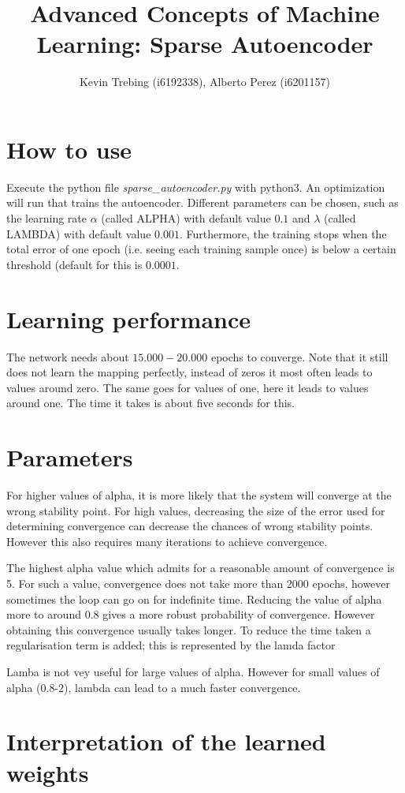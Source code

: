 \documentclass[a4paper]{article}
\title{Advanced Concepts of Machine Learning: Sparse Autoencoder}
\author{Kevin Trebing (i6192338), Alberto Perez (i6201157)}
\begin{document}
\maketitle

\section{How to use}
Execute the python file \textit{sparse\_autoencoder.py} with python3. An optimization will run that trains the autoencoder. Different parameters can be chosen, such as the learning rate $\alpha$ (called ALPHA) with default value $0.1$ and $\lambda$ (called LAMBDA) with default value $0.001$. Furthermore, the training stops when the total error of one epoch (i.e. seeing each training sample once) is below a certain threshold (default for this is $0.0001$.


\section{Learning performance}
The network needs about $15.000-20.000$ epochs to converge. Note that it still does not learn the mapping perfectly, instead of zeros it most often leads to values around zero. The same goes for values of one, here it leads to values around one. The time it takes is about five seconds for this. 

\section{Parameters}


For higher values of alpha, it is more likely that the system will converge at the wrong stability point. For high values, decreasing the size of the error used for determining convergence can decrease the chances of wrong stability points. However this also requires many iterations to achieve convergence.

The highest alpha value which admits for a reasonable amount of convergence is 5. For such a value, convergence does not take more than 2000 epochs, however sometimes the loop can go on for indefinite time. Reducing the value of alpha more to around 0.8 gives a  more robust probability of  convergence. However obtaining this convergence usually takes longer. To reduce the time taken a regularisation term is added; this is represented by the lamda factor


Lamba is not vey useful for large values of alpha. However for small values of alpha (0.8-2), lambda can lead to a much faster convergence. 




\section{Interpretation of the learned weights}

\end{document}

